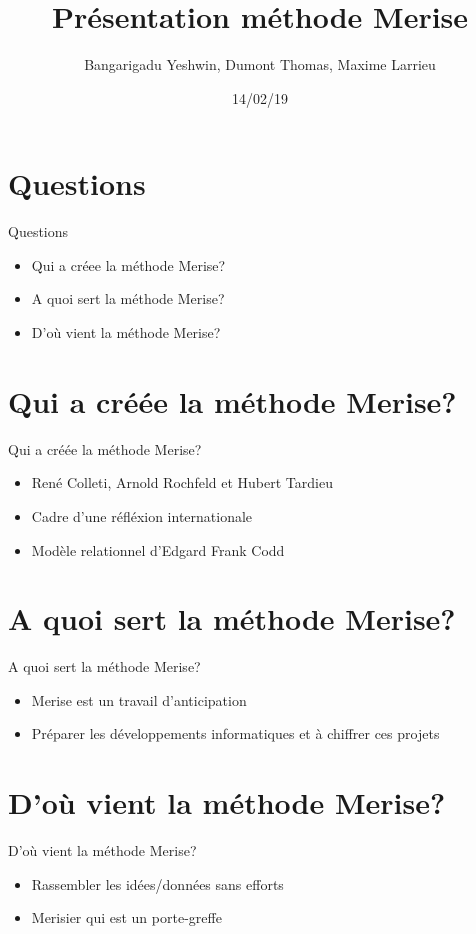 \documentclass{beamer}
\title[Your Short Title]{Présentation méthode Merise}
\author{Bangarigadu Yeshwin, Dumont Thomas, Maxime Larrieu}
\institute{B1A Ynov Informatique}
\date{14/02/19}
\begin{document}
\begin{frame}
  \titlepage
\end{frame}


\section{Questions}
\begin{frame}{Questions}
\begin{itemize}
  \item Qui a créee la méthode Merise?
  \item A quoi sert la méthode Merise?
  \item D'où vient la méthode Merise?
\end{itemize}
\vskip 5cm
\end{frame}

\section{Qui a créée la méthode Merise?}
\begin{frame}{Qui a créée la méthode Merise?}
\begin{itemize}
  \item René Colleti, Arnold Rochfeld et Hubert Tardieu
  \item Cadre d'une réfléxion internationale
  \item Modèle relationnel d'Edgard Frank Codd
\end{itemize}
\vskip 5cm
\end{frame}

\section{A quoi sert la méthode Merise?}
\begin{frame}{A quoi sert la méthode Merise?}
\begin{itemize}
  \item Merise est un travail d'anticipation
  \item Préparer les développements informatiques et à chiffrer ces projets
\end{itemize}
\vskip 5cm
\end{frame}

\section{D'où vient la méthode Merise?}
\begin{frame}{D'où vient la méthode Merise?}
\begin{itemize}
  \item Rassembler les idées/données sans efforts
  \item Merisier qui est un porte-greffe
\end{itemize}
\vskip 5cm
\end{frame}
\end{document}
